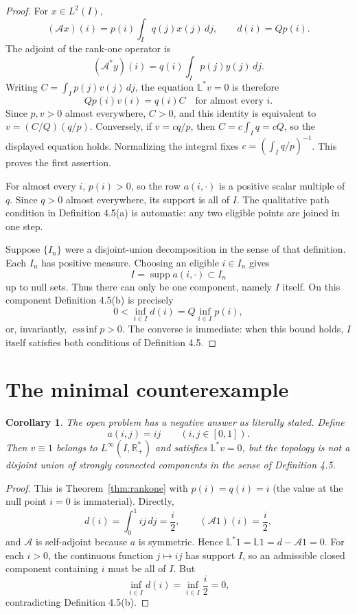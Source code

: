 \documentclass[11pt]{article}
\newtheorem{corollary}[theorem]{Corollary}
\newcommand{\essinf}{\operatorname*{ess\,inf}}
\newcommand{\Lop}{\mathbb L}
\newcommand{\Aop}{\mathcal A}
\begin{document}
\begin{proof}
For $x\in L^2(I)$,
\[
 (\Aop x)(i)=p(i)\int_Iq(j)x(j)\,dj,
 \qquad d(i)=Qp(i).
\]
The adjoint of the rank-one operator is
\[
 (\Aop^*y)(i)=q(i)\int_Ip(j)y(j)\,dj.
\]
Writing $C=\int_Ip(j)v(j)\,dj$, the equation $\Lop^*v=0$ is therefore
\[
 Qp(i)v(i)=q(i)C \quad\text{for almost every }i.
\]
Since $p,v>0$ almost everywhere, $C>0$, and this identity is equivalent to
$v=(C/Q)(q/p)$. Conversely, if $v=cq/p$, then
$C=c\int_Iq=cQ$, so the displayed equation holds. Normalizing the integral
fixes $c=(\int_Iq/p)^{-1}$. This proves the first assertion.

For almost every $i$, $p(i)>0$, so the row $a(i,\cdot)$ is a positive scalar
multiple of $q$. Since $q>0$ almost everywhere, its support is all of $I$.
The qualitative path condition in Definition 4.5(a) is automatic: any two
eligible points are joined in one step.

Suppose $\{I_n\}$ were a disjoint-union decomposition in the sense of that
definition. Each $I_n$ has positive measure. Choosing an eligible
$i\in I_n$ gives
\[
 I=\operatorname{supp}a(i,\cdot)\subset I_n
\]
up to null sets. Thus there can only be one component, namely $I$ itself.
On this component Definition 4.5(b) is precisely
\[
 0<\inf_{i\in I}d(i)=Q\inf_{i\in I}p(i),
\]
or, invariantly, $\essinf p>0$. The converse is immediate: when this bound
holds, $I$ itself satisfies both conditions of Definition 4.5.
\end{proof}

\section{The minimal counterexample}

\begin{corollary}\label{cor:counterexample}
The open problem has a negative answer as literally stated.  Define
\[
 a(i,j)=ij\qquad (i,j\in[0,1]).
\]
Then $v\equiv1$ belongs to $L^\infty(I,\mathbb R_+^*)$ and satisfies
$\Lop^*v=0$, but the topology is not a disjoint union of strongly connected
components in the sense of Definition 4.5.
\end{corollary}

\begin{proof}
This is Theorem~\ref{thm:rankone} with $p(i)=q(i)=i$ (the value at the null
point $i=0$ is immaterial). Directly,
\[
 d(i)=\int_0^1ij\,dj=\frac{i}{2},
 \qquad
 (\Aop1)(i)=\frac{i}{2},
\]
and $\Aop$ is self-adjoint because $a$ is symmetric. Hence
$\Lop^*1=\Lop1=d-\Aop1=0$. For each $i>0$, the continuous function
$j\mapsto ij$ has support $I$, so an admissible closed component containing
$i$ must be all of $I$. But
\[
 \inf_{i\in I}d(i)=\inf_{i\in I}\frac{i}{2}=0,
\]
contradicting Definition 4.5(b).
\end{proof}
\end{document}
